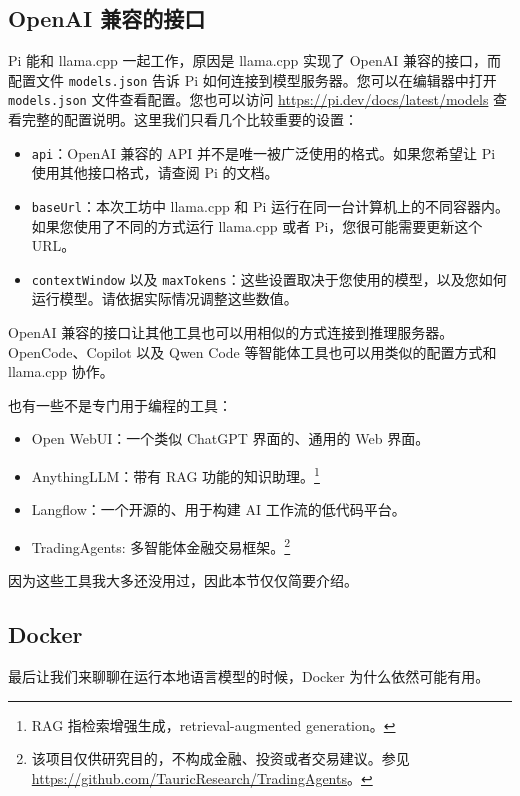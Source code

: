\documentclass[a4paper,12pt]{article}
\begin{document}
\subsection{OpenAI 兼容的接口}
\label{sec:api}

Pi 能和 llama.cpp 一起工作，原因是 llama.cpp 实现了 OpenAI 兼容的接口，而配置文件 \texttt{models.json} 告诉 Pi 如何连接到模型服务器。您可以在编辑器中打开 \texttt{models.json} 文件查看配置。您也可以访问 \url{https://pi.dev/docs/latest/models} 查看完整的配置说明。这里我们只看几个比较重要的设置：

\begin{itemize}
\item \texttt{api}：OpenAI 兼容的 API 并不是唯一被广泛使用的格式。如果您希望让 Pi 使用其他接口格式，请查阅 Pi 的文档。
\item \texttt{baseUrl}：本次工坊中 llama.cpp 和 Pi 运行在同一台计算机上的不同容器内。如果您使用了不同的方式运行 llama.cpp 或者 Pi，您很可能需要更新这个 URL。
\item \texttt{contextWindow} 以及 \texttt{maxTokens}：这些设置取决于您使用的模型，以及您如何运行模型。请依据实际情况调整这些数值。
\end{itemize}

OpenAI 兼容的接口让其他工具也可以用相似的方式连接到推理服务器。OpenCode、Copilot 以及 Qwen Code 等智能体工具也可以用类似的配置方式和 llama.cpp 协作。

也有一些不是专门用于编程的工具：

\begin{itemize}
\item Open WebUI：一个类似 ChatGPT 界面的、通用的 Web 界面。
\item AnythingLLM：带有 RAG 功能的知识助理。\footnote{RAG 指检索增强生成，retrieval-augmented generation。}
\item Langflow：一个开源的、用于构建 AI 工作流的低代码平台。
\item TradingAgents: 多智能体金融交易框架。\footnote{该项目仅供研究目的，不构成金融、投资或者交易建议。参见 \url{https://github.com/TauricResearch/TradingAgents}。}
\end{itemize}

因为这些工具我大多还没用过，因此本节仅仅简要介绍。

\subsection{Docker}
\label{sec:Docker}

最后让我们来聊聊在运行本地语言模型的时候，Docker 为什么依然可能有用。
\end{document}
